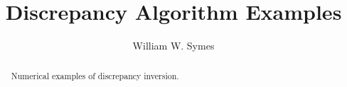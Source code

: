 \title{Discrepancy Algorithm Examples}
\author{William W. Symes}



\maketitle
\begin{abstract}
Numerical examples of discrepancy inversion.
\end{abstract}

